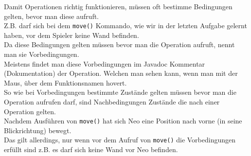 \begin{Infobox}
    Damit Operationen richtig funktionieren, müssen oft bestimme Bedingungen gelten, bevor man diese aufruft.\\
Z.B. darf sich bei dem \lstinline{move()} Kommando, wie wir in der letzten Aufgabe gelernt haben, vor dem Spieler keine Wand befinden.\\
Da diese Bedingungen gelten müssen bevor man die Operation aufruft, nennt man sie Vorbedingungen.\\
Meistens findet man diese Vorbedingungen im Javadoc Kommentar (Dokumentation) der Operation. Welchen man sehen kann, wenn man mit der Maus, über dem Funktionsnamen hovert.\\

So wie bei Vorbedingungen bestimmte Zustände gelten müssen bevor man die Operation aufrufen darf, sind Nachbedingungen Zustände die nach einer Operation gelten.\\
Nachdem Ausführen von \lstinline{move()} hat sich Neo eine Position nach vorne (in seine Blickrichtung) bewegt.\\
Das gilt allerdings, nur wenn vor dem Aufruf von \lstinline{move()} die Vorbedingungen erfüllt sind z.B. es darf sich keine Wand vor Neo befinden.\\


\end{Infobox}
